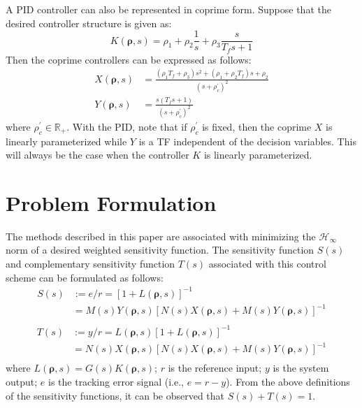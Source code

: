 \documentclass[letterpaper, 10 pt, conference]{ieeeconf}  %
\begin{document}
A PID controller can also be represented in coprime form. Suppose that the desired controller structure is given as:
\begin{equation} \label{eq:pid}
K(\bm{\rho},s)=\rho_1 + \rho_2 \frac{1}{s} + \rho_3 \frac{s}{T_fs+1}
\end{equation}
Then the coprime controllers can be expressed as follows:
\begin{equation}
\begin{aligned} \label{eq:pid_2}
X(\bm{\rho},s) &= \frac{(\rho_1 T_f+\rho_3)s^2 + (\rho_1+\rho_2 T_f)s + \rho_2}{(s+\rho_c^{\prime})^2}\\
Y(\bm{\rho},s) &= \frac{s(T_fs+1)}{(s+\rho_c^{\prime})^2}
\end{aligned}
\end{equation}
where $\rho_c^{\prime} \in \mathbb{R}_+$. With the PID, note that if $\rho_c^{\prime}$ is fixed, then the coprime $X$ is linearly parameterized while $Y$ is a TF independent of the decision variables. This will always be the case when the controller $K$ is linearly parameterized.
\section{Problem Formulation} \label{sec:problem_form}
The methods described in this paper are associated with minimizing the $\mathcal{H}_{\infty}$ norm of a desired weighted sensitivity function. The sensitivity function $S(s)$ and complementary sensitivity function $T(s)$ associated with this control scheme can be formulated as follows:
\begin{equation}
\begin{aligned} \label{eq:S}
S(s) &:= e/r =[1+L(\bm{\rho},s)]^{-1} \\ &=  M(s)Y(\bm{\rho},s)[N(s)X(\bm{\rho},s)+M(s)Y(\bm{\rho},s)]^{-1}\\
\end{aligned}
\end{equation}
\begin{equation}
\begin{aligned} \label{eq:T}
T(s) &:= y/r =L(\bm{\rho},s)[1+L(\bm{\rho},s)]^{-1} \\ &=  N(s)X(\bm{\rho},s)[N(s)X(\bm{\rho},s)+M(s)Y(\bm{\rho},s)]^{-1}\\
\end{aligned}
\end{equation}
where $L(\bm{\rho},s) = G(s)K(\bm{\rho},s)$; $r$ is the reference input; $y$ is the system output; $e$ is the tracking error signal (i.e., $e = r-y$). From the above definitions of the sensitivity functions, it can be observed that $S(s)+T(s)=1$.
\end{document}
